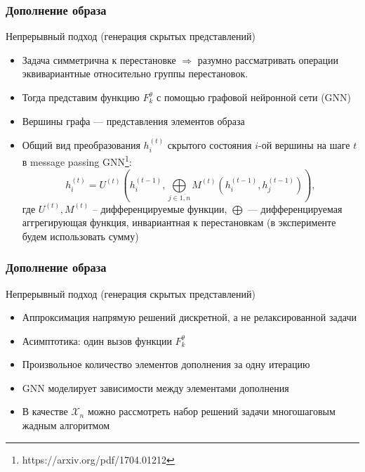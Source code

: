 \documentclass[10pt]{beamer}
\begin{document}
\begin{frame}
	\frametitle{Дополнение образа}
	\begin{block}{Непрерывный подход (генерация скрытых представлений)}
		\begin{itemize}
			\item  Задача симметрична к перестановке $\Longrightarrow$ разумно рассматривать операции эквивариантные относительно группы перестановок.
			\item Тогда представим функцию $F_k^\theta$ с помощью графовой нейронной сети (GNN)
			\item Вершины графа --- представления элементов образа
			\item Общий вид преобразования $h_i^{(t)}$ скрытого состояния $i$-ой вершины на шаге $t$ в message passing GNN\footnote{https://arxiv.org/pdf/1704.01212}:
			$$h_i^{(t)} = U^{(t)} \left(h_i^{(t-1)}, \bigoplus\limits_{j\in \overline{1, n}}M^{(t)} \left(h_i^{(t-1)}, h_j^{(t-1)} \right) \right),$$
			где $U^{(t)}, M^{(t)}$ -- дифференцируемые функции, $\bigoplus$ --- дифференцируемая аггрегирующая функция, инвариантная к перестановкам (в эксперименте будем использовать сумму)
		\end{itemize}
	\end{block}
\end{frame}

\begin{frame}
	\frametitle{Дополнение образа}
	\begin{block}{Непрерывный подход (генерация скрытых представлений)}
		\begin{itemize}
			\item Аппроксимация напрямую решений дискретной, а не релаксированной задачи
			\item Асимптотика: один вызов функции $F_k^\theta$
			\item Произвольное количество элементов дополнения за одну итерацию
			\item GNN моделирует зависимости между элементами дополнения
			\item В качестве $\mathcal{X}_n$ можно рассмотреть набор решений задачи многошаговым жадным алгоритмом
		\end{itemize}
	\end{block}
\end{frame}
\end{document}
